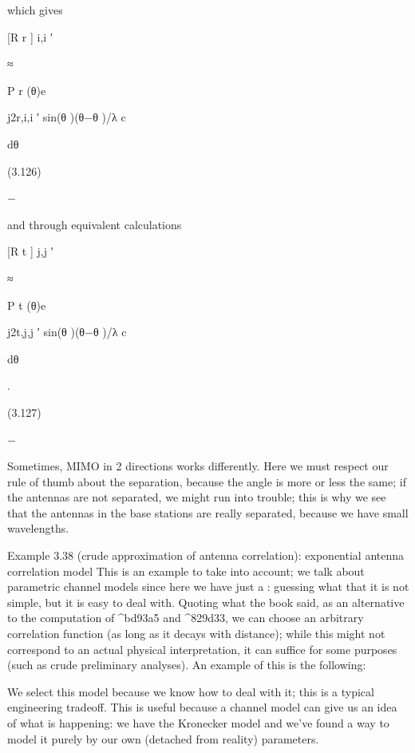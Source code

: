 {{{{which gives

\pi

[R r ] i,i ′

≈

\int

P r (θ)e

j2\pid r,i,i ′ sin(\mu θ )(θ−\mu θ )/λ c

dθ

(3.126)

−\pi

and through equivalent calculations

\pi

[R t ] j,j ′

≈

\int

P t (θ)e

j2\pid t,j,j ′ sin(\mu θ )(θ−\mu θ )/λ c

dθ

.

(3.127)

−\pi

Sometimes, MIMO in 2 directions works differently. Here we must respect our rule of thumb about the separation, because the angle is more or less the same; if the antennas are not separated, we might run into trouble; this is why we see that the antennas in the base stations are really separated, because we have small wavelengths.

Example 3.38 (crude approximation of antenna correlation):
exponential antenna correlation model This is an example to take into account; we talk about parametric channel models since here we have just a \rho: guessing what that it is not simple, but it is easy to deal with.
Quoting what the book said, as an alternative to the computation of ^bd93a5 and
^829d33, we can choose an arbitrary correlation function (as long as it decays with distance); while this might not correspond to an actual physical interpretation, it can suffice for some purposes (such as crude preliminary analyses).
An example of this is the following:

We select this model because we know how to deal with it; this is a typical engineering tradeoff.
This is useful because a channel model can give us an idea of what is happening: we have the Kronecker model and we've found a way to model it purely by our own
(detached from reality) parameters.

}}}}
